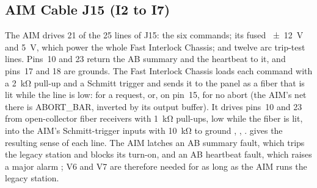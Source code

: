 \subsection{AIM Cable J15 (I2 to I7)}\label{sec:io-aim}

The AIM drives 21 of the 25 lines of J15: the six commands; its fused \qty{\pm 12}{\volt}
and \qty{5}{\volt}, which power the whole Fast Interlock Chassis;
and twelve arc trip-test lines. Pins~10 and 23 return the AB summary and the heartbeat
to it, and pins~17 and 18 are grounds. The Fast Interlock Chassis loads each command
with a \qty{2}{\kilo\ohm} pull-up and a Schmitt trigger and sends it to the panel as a
fiber that is lit while the line is low: for a request, or, on pin~15, for no abort
(the AIM's net there is ABORT\_BAR, inverted by its output buffer). It drives pins~10
and 23 from open-collector fiber receivers with \qty{1}{\kilo\ohm} pull-ups, low while
the fiber is lit, into the AIM's Schmitt-trigger inputs with \qty{10}{\kilo\ohm} to
ground , , .  gives the resulting sense of each line.
The AIM latches an AB summary fault, which trips the legacy station and blocks its
turn-on, and an AB heartbeat fault, which raises a major alarm ; V6 and V7 are
therefore needed for as long as the AIM runs the legacy station.

